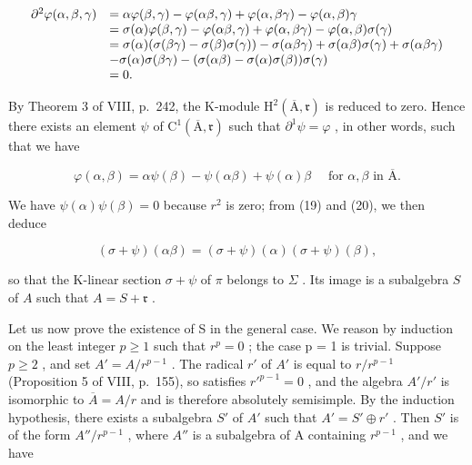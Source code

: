 \[
\begin{array}{r l} \partial^ {2} \varphi (\alpha , \beta , \gamma) & = \alpha \varphi (\beta , \gamma) - \varphi (\alpha \beta , \gamma) + \varphi (\alpha , \beta \gamma) - \varphi (\alpha , \beta) \gamma \\ & = \sigma (\alpha) \varphi (\beta , \gamma) - \varphi (\alpha \beta , \gamma) + \varphi (\alpha , \beta \gamma) - \varphi (\alpha , \beta) \sigma (\gamma) \\ & = \sigma (\alpha) (\sigma (\beta \gamma) - \sigma (\beta) \sigma (\gamma)) - \sigma (\alpha \beta \gamma) + \sigma (\alpha \beta) \sigma (\gamma) + \sigma (\alpha \beta \gamma) \\ & - \sigma (\alpha) \sigma (\beta \gamma) - (\sigma (\alpha \beta) - \sigma (\alpha) \sigma (\beta)) \sigma (\gamma) \\ & = 0. \end{array}
\]

By Theorem 3 of VIII, p.~242, the K-module \(\mathrm{H}^{2}(\overline{\mathrm{A}},\mathfrak{r})\) is reduced to zero. Hence there exists an element \(\psi\) of \(\mathrm{C}^{1}(\overline{\mathrm{A}},\mathfrak{r})\) such that \(\partial^{1}\psi = \varphi\) , in other words, such that we have

\[
\varphi (\alpha , \beta) = \alpha \psi (\beta) - \psi (\alpha \beta) + \psi (\alpha) \beta \quad \text { for } \alpha , \beta \text { in } \overline {{\mathrm{A}}}.\tag{21}
\]

We have \(\psi(\alpha)\psi(\beta)=0\) because \(r^{2}\) is zero; from (19) and (20), we then deduce

\[
(\sigma + \psi) (\alpha \beta) = (\sigma + \psi) (\alpha) (\sigma + \psi) (\beta),\tag{22}
\]

so that the K-linear section \(\sigma +\psi\) of \(\pi\) belongs to \(\Sigma\) . Its image is a subalgebra \(S\) of \(A\) such that \(A = S + \mathfrak{r}\) .

Let us now prove the existence of S in the general case. We reason by induction on the least integer \(p \geqslant 1\) such that \(r^{p} = 0\) ; the case p = 1 is trivial. Suppose \(p \geqslant 2\) , and set \(A' = A/r^{p-1}\) . The radical \(r'\) of \(A'\) is equal to \(r/r^{p-1}\) (Proposition 5 of VIII, p.~155), so satisfies \(r'^{p-1} = 0\) , and the algebra \(A'/r'\) is isomorphic to \(\overline{A} = A/r\) and is therefore absolutely semisimple. By the induction hypothesis, there exists a subalgebra \(S'\) of \(A'\) such that \(A' = S' \oplus r'\) . Then \(S'\) is of the form \(A''/r^{p-1}\) , where \(A''\) is a subalgebra of A containing \(r^{p-1}\) , and we have

